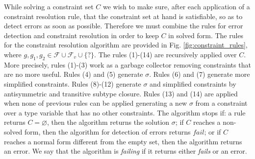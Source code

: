 \documentclass{eptcs}
\newcommand{\caF}{\ensuremath{\mathcal{F}}\xspace}
\newcommand{\CC}{\ensuremath{C}\xspace}
\begin{document}
While solving a constraint set $\CC$ we wish to make sure, after each
application of a constraint resolution rule, that the constraint set at hand is
satisfiable, so as to detect
errors as soon as possible. Therefore we must combine the rules for error detection and constraint
resolution in order to keep $\CC$ in solved form. The rules for the constraint resolution algorithm are provided in Fig.
\ref{fig:constraint_rules}, where $g, g_1, g_2 \in \caF\cup\caF_v\cup\{?\}$. The
rules (1)-(14) are recursively applied over $\CC$. More precisely, rules (1)-(3) work as a garbage
collector removing constraints that are no more useful. Rules (4) and (5)
generate $\sigma$. Rules (6) and (7) generate more simplified constraints. Rules (8)-(12)
generate $\sigma$ and simplified constraints by antisymmetric and transitive
subtype closure. Rules (13) and (14) are applied when none of previous rules can be applied
generating a new $\sigma$ from a constraint over a type variable that has no
other constraints. The algorithm stops if: a rule returns $\CC =
\varnothing$, then the algorithm returns 
the solution $\sigma$; if $\CC$ reaches a non-solved form, then the algorithm for detection of
errors returns $fail$; or if $\CC$ reaches a normal form different from the empty set,
then the algorithm returns an error. We say that the algorithm is \textit{failing} if it
returns either \textit{fails} or an error.
\end{document}
